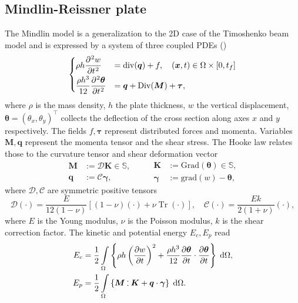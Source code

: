\documentclass{ifacconf}
\DeclareMathOperator{\Tr}{Tr}
\def\onedot{$\mathsurround0pt\ldotp$}
\def\cddot{%
	\mathbin{\vcenter{\baselineskip.67ex
			\hbox{\onedot}\hbox{\onedot}}%
}}
\begin{document}
\subsection{Mindlin-Reissner plate}
The Mindlin model is a generalization to the 2D case of the Timoshenko beam model and is expressed by a system of three coupled PDEs (\cite{timoshenko1959theory}) 
\begin{equation}
\begin{cases}
\displaystyle \rho h \diffp[2]{w}{t} &= \mathrm{div}(\bm{q}) + f, \quad (\bm{x}, t) \in \Omega \times [0, t_f]  \vspace{1mm}\\
\displaystyle \frac{\rho h^3}{12} \diffp[2]{\bm \theta}{t} &= \bm{q} + \mathrm{Div}(\bm M) + \bm{\tau}, \\
\end{cases}
\end{equation}
where $\rho$ is the mass density, $h$ the plate thickness, $w$ the vertical displacement, $\bm \theta = (\theta_x, \theta_y)^\top$ collects the deflection of the cross section along axes $x$ and $y$ respectively. The fields $f, \bm{\tau}$ represent distributed forces and momenta. Variables $\bm{M}, \bm{q}$ represent the momenta tensor and the shear stress. The Hooke law relates those to the curvature tensor and shear deformation vector
\begin{equation*}
\begin{aligned}
\bm{M} &:= \mathcal{D} \bm{K} \in \mathbb{S}, \\ \bm{q} &:= \mathcal{C} \bm{\gamma},
\end{aligned} \qquad
\begin{aligned}
\bm{K} &:= \mathrm{Grad}(\bm{\theta}) \in \mathbb{S}, \\ \bm{\gamma} &:= \mathrm{grad}(w) - \bm{\theta}, 
\end{aligned}
\end{equation*}
where $\mathcal{D}, \mathcal{C}$ are symmetric positive tensors
\begin{equation}
\label{eq:bend_rig_tensor}
	\mathcal{D} (\cdot) = \frac{E}{12 (1 - \nu)}[(1-\nu)(\cdot) + \nu \Tr(\cdot)], \quad \mathcal{C} (\cdot) = \frac{E k }{2(1+\nu)}(\cdot),
\end{equation}
where $E$ is the Young modulus, $\nu$ is the Poisson modulus, $k$ is the shear correction factor.
 The kinetic and potential energy  $E_c, E_p$ read
\begin{equation}
\begin{aligned}
E_c &=  \frac{1}{2} \int_{\Omega} \left\{ \rho h \left(\diffp{w}{t} \right)^2 +  \frac{\rho h^3}{12} \diffp{\bm{\theta}}{t} \cdot \diffp{\bm{\theta}}{t}  \right\} \d\Omega, \\
E_p &= \frac{1}{2} \int_{\Omega} \left\{ \bm{M} \cddot \bm{K} + \bm{q} \cdot \bm{\gamma}  \right\}\d\Omega.
\end{aligned}
\end{equation} 
\end{document}
